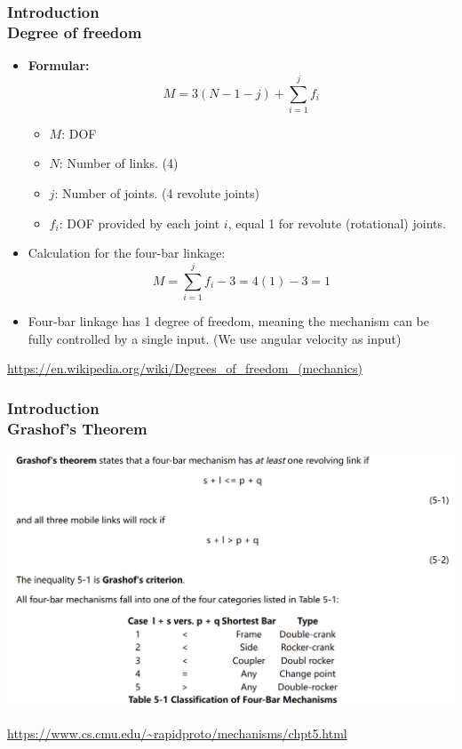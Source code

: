 \documentclass[ucs,10pt]{beamer}
\begin{document}
\begin{frame}
\frametitle{Introduction \\
    \small \color{rwth-blue} Degree of freedom}

    \begin{itemize}
        \item \textbf{Formular:}
        \[
        M = 3(N - 1 - j) + \sum_{i=1}^{j} f_i
        \]
        \begin{itemize}
            \item \( M \): DOF
            \item \( N \): Number of links. (4)
            \item \( j \): Number of joints. (4 revolute joints)
            \item \( f_i \): DOF provided by each joint \( i \), equal 1 for revolute (rotational) joints.
        \end{itemize}

        \item Calculation for the four-bar linkage:
        \[
        M = \sum_{i=1}^{j} f_i - 3 = 4(1) - 3 = 1
        \]

        \item Four-bar linkage has 1 degree of freedom, meaning the mechanism can be fully controlled by a single input. (We use angular velocity as input)
    \end{itemize}

    {\tiny \url{https://en.wikipedia.org/wiki/Degrees_of_freedom_(mechanics)}}
\end{frame}

\begin{frame}
\frametitle{Introduction \\
    \small \color{rwth-blue} Grashof's Theorem}

    \begin{center}
        \includegraphics[width=\linewidth]{./Figures/introduction/introduction_classification.png}
    \end{center}

    {\tiny \url{https://www.cs.cmu.edu/~rapidproto/mechanisms/chpt5.html}}
\end{frame}
\end{document}
